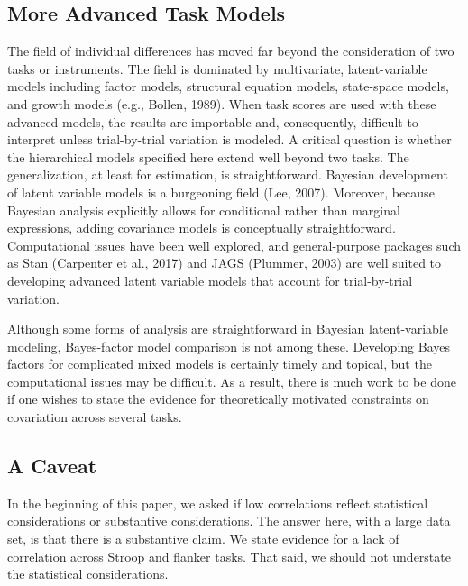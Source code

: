 \documentclass[english,man]{apa6}
\theoremstyle{definition}
\theoremstyle{definition}
\theoremstyle{definition}
\theoremstyle{remark}
\begin{document}
\subsection{More Advanced Task Models}\label{more-advanced-task-models}

The field of individual differences has moved far beyond the
consideration of two tasks or instruments. The field is dominated by
multivariate, latent-variable models including factor models, structural
equation models, state-space models, and growth models (e.g., Bollen,
1989). When task scores are used with these advanced models, the results
are importable and, consequently, difficult to interpret unless
trial-by-trial variation is modeled. A critical question is whether the
hierarchical models specified here extend well beyond two tasks. The
generalization, at least for estimation, is straightforward. Bayesian
development of latent variable models is a burgeoning field (Lee, 2007).
Moreover, because Bayesian analysis explicitly allows for conditional
rather than marginal expressions, adding covariance models is
conceptually straightforward. Computational issues have been well
explored, and general-purpose packages such as Stan (Carpenter et al.,
2017) and JAGS (Plummer, 2003) are well suited to developing advanced
latent variable models that account for trial-by-trial variation.

Although some forms of analysis are straightforward in Bayesian
latent-variable modeling, Bayes-factor model comparison is not among
these. Developing Bayes factors for complicated mixed models is
certainly timely and topical, but the computational issues may be
difficult. As a result, there is much work to be done if one wishes to
state the evidence for theoretically motivated constraints on
covariation across several tasks.

\subsection{A Caveat}\label{a-caveat}

In the beginning of this paper, we asked if low correlations reflect
statistical considerations or substantive considerations. The answer
here, with a large data set, is that there is a substantive claim. We
state evidence for a lack of correlation across Stroop and flanker
tasks. That said, we should not understate the statistical
considerations.
\end{document}
